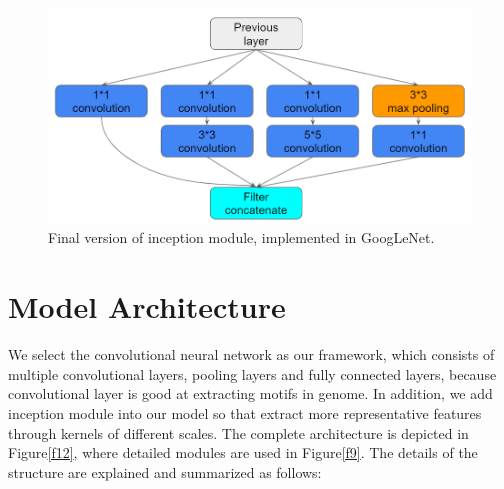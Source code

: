 \begin{figure}[H]
    \centering
    \includegraphics[width=0.8\columnwidth]{body/figure/figure8.png}
    \captionsetup{labelfont=bf}
    \renewcommand{\baselinestretch}{1.0}
    \caption[Final version of inception module]{Final version of inception module, implemented in GoogLeNet.}
    \label{f8}
\end{figure}

\section{Model Architecture} \label{method}
We select the convolutional neural network as our framework, which consists of multiple convolutional layers, pooling layers and fully connected layers, because convolutional layer is good at extracting motifs in genome. In addition, we add inception module into our model so that extract more representative features through kernels of different scales. The complete architecture is depicted in Figure\ref{f12}, where detailed modules are used in Figure\ref{f9}. The details of the structure are explained and summarized as follows:

